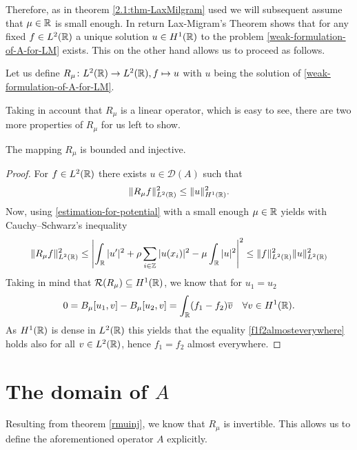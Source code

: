 Therefore, as in theorem \ref{2.1:thm-LaxMilgram} used we will subsequent assume that $\mu \in \mathbb{R}$ is small enough. In return Lax-Migram's Theorem shows that for any fixed $f \in L^{2}(\mathbb{R})$ a unique solution $u \in H^{1}(\mathbb{R})$ to the problem \eqref{weak-formulation-of-A-for-LM} exists. This on the other hand allows us to proceed as follows.

\begin{definition}
	Let us define $R_{\mu} \colon L^{2}(\mathbb{R}) \rightarrow L^{2}(\mathbb{R}), f \mapsto u$ with $u$ being the solution of \eqref{weak-formulation-of-A-for-LM}.
\end{definition}
 
Taking in account that $R_{\mu}$ is a linear operator, which is easy to see, there are two more properties of $R_{\mu}$ for us left to show. 

\begin{theorem} \label{rmuinj}
	The mapping $R_{\mu}$ is bounded and injective.
	
	\begin{proof}
		For $f \in L^{2}(\mathbb{R})$ there exists $u \in \mathcal{D}(A)$ such that
		\[ \| R_{\mu} f \|_{L^{2}(\mathbb{R})}^{2} \leq \| u \|_{H^{1}(\mathbb{R})}^{2}. \] %
		Now, using \eqref{estimation-for-potential} with a small enough $\mu \in \mathbb{R}$ yields with Cauchy–Schwarz's inequality
		\[ \| R_{\mu} f \|_{L^{2}(\mathbb{R})}^{2} \leq \left| \int_{\mathbb{R}} |u'|^{2} + \rho \sum_{i \in \mathbb{Z}} |u(x_{i})|^{2} - \mu \int_{\mathbb{R}} |u|^{2} \right|^{2}  \leq \| f \|_{L^{2}(\mathbb{R})}^{2} \| u \|_{L^{2}(\mathbb{R})}^{2} \]	
		Taking in mind that $\mathcal{R}(R_{\mu}) \subseteq H^{1}(\mathbb{R})$, we know that for $u_{1} = u_{2}$
		\begin{equation}
			0 = B_{\mu}[u_{1}, v] - B_{\mu}[u_{2}, v]= \int_{\mathbb{R}} (f_{1} - f_{2}) \overline{v} \quad \forall v \in H^{1}(\mathbb{R}). \label{f1f2almosteverywhere}
		\end{equation} 
		As $H^{1}(\mathbb{R})$ is dense in $L^{2}(\mathbb{R})$ this yields that the equality \eqref{f1f2almosteverywhere} holds also for all $v \in L^{2}(\mathbb{R})$, hence $f_{1} = f_{2}$ almost everywhere. 
	\end{proof}
\end{theorem}



\section{The domain of $A$}

Resulting from theorem \ref{rmuinj}, we know that $R_{\mu}$ is invertible. This allows us to define the aforementioned operator $A$ explicitly.

